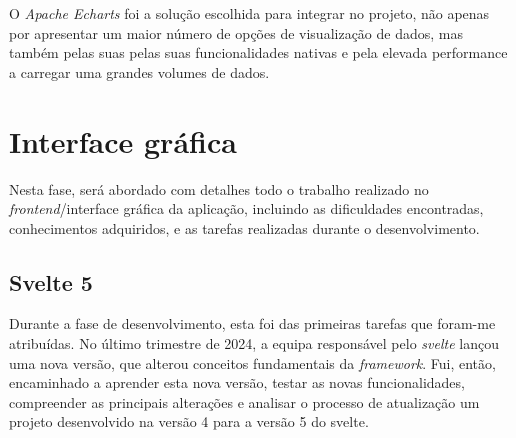 O \textit{Apache Echarts} foi a solução escolhida para integrar no projeto, não apenas por apresentar um maior número de opções de visualização de dados, mas também pelas suas pelas suas funcionalidades nativas e pela elevada performance a carregar uma grandes volumes de dados. 

\clearpage
\section{Interface gráfica}\label{sec:frontend}
Nesta fase, será abordado com detalhes todo o trabalho realizado no \textit{frontend}/interface gráfica da aplicação, incluindo as dificuldades encontradas, conhecimentos adquiridos, e as tarefas realizadas durante o desenvolvimento.  

\subsection{Svelte 5}
Durante a fase de desenvolvimento, esta foi das primeiras tarefas que foram-me atribuídas. No último trimestre de 2024, a equipa responsável pelo \textit{svelte} lançou uma nova versão, que alterou conceitos fundamentais da \textit{framework}. Fui, então, encaminhado a aprender esta nova versão, testar as novas funcionalidades, compreender as principais alterações e analisar o processo de atualização um projeto desenvolvido na versão 4 para a versão 5 do svelte.